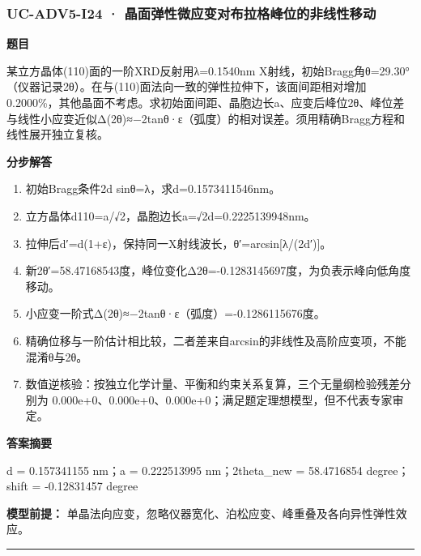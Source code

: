 \documentclass[UTF8,11pt,a4paper]{ctexart}
\begin{document}
\subsubsection*{UC-ADV5-I24 · 晶面弹性微应变对布拉格峰位的非线性移动}
\noindent\textbf{题目}\par
某立方晶体(110)面的一阶XRD反射用λ=0.1540nm X射线，初始Bragg角θ=29.30°（仪器记录2θ）。在与(110)面法向一致的弹性拉伸下，该面间距相对增加0.2000\%，其他晶面不考虑。求初始面间距、晶胞边长a、应变后峰位2θ、峰位差与线性小应变近似Δ(2θ)≈−2tanθ·ε（弧度）的相对误差。须用精确Bragg方程和线性展开独立复核。\par
\medskip\noindent\textbf{分步解答}
\begin{enumerate}
\item 初始Bragg条件2d sinθ=λ，求d=0.1573411546nm。
\item 立方晶体d110=a/√2，晶胞边长a=√2d=0.2225139948nm。
\item 拉伸后d′=d(1+ε)，保持同一X射线波长，θ′=arcsin[λ/(2d′)]。
\item 新2θ′=58.47168543度，峰位变化Δ2θ=-0.1283145697度，为负表示峰向低角度移动。
\item 小应变一阶式Δ(2θ)≈−2tanθ·ε（弧度）=-0.1286115676度。
\item 精确位移与一阶估计相比较，二者差来自arcsin的非线性及高阶应变项，不能混淆θ与2θ。
\item 数值逆核验：按独立化学计量、平衡和约束关系复算，三个无量纲检验残差分别为 0.000e+0、0.000e+0、0.000e+0；满足题定理想模型，但不代表专家审定。
\end{enumerate}
\noindent\textbf{答案摘要}\par
d = 0.157341155 nm；a = 0.222513995 nm；2theta\_new = 58.4716854 degree；shift = -0.12831457 degree\par
\noindent\textbf{模型前提：}
单晶法向应变，忽略仪器宽化、泊松应变、峰重叠及各向异性弹性效应。\par
\medskip\hrule\medskip
{}
\end{document}

